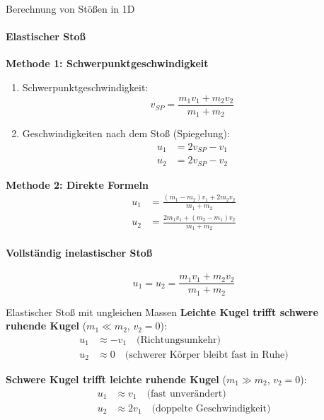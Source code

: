 \begin{KR}{Berechnung von Stößen in 1D}
    \paragraph{Elastischer Stoß}
    \textbf{Methode 1: Schwerpunktgeschwindigkeit}
    \begin{enumerate}
        \item Schwerpunktgeschwindigkeit:
        \begin{equation}
            v_{SP} = \frac{m_1 v_1 + m_2 v_2}{m_1 + m_2}
        \end{equation}
        
        \item Geschwindigkeiten nach dem Stoß (Spiegelung):
        \begin{align}
            u_1 &= 2v_{SP} - v_1 \\
            u_2 &= 2v_{SP} - v_2
        \end{align}
    \end{enumerate}
    
    \textbf{Methode 2: Direkte Formeln}
    \begin{align}
        u_1 &= \frac{(m_1 - m_2)v_1 + 2m_2 v_2}{m_1 + m_2} \\
        u_2 &= \frac{2m_1 v_1 + (m_2 - m_1)v_2}{m_1 + m_2}
    \end{align}
    
    \paragraph{Vollständig inelastischer Stoß}
    \begin{equation}
        u_1 = u_2 = \frac{m_1 v_1 + m_2 v_2}{m_1 + m_2}
    \end{equation}
\end{KR}

\begin{example2}{Elastischer Stoß mit ungleichen Massen}
    \textbf{Leichte Kugel trifft schwere ruhende Kugel} ($m_1 \ll m_2$, $v_2 = 0$):
    \begin{align}
        u_1 &\approx -v_1 \quad \text{(Richtungsumkehr)} \\
        u_2 &\approx 0 \quad \text{(schwerer Körper bleibt fast in Ruhe)}
    \end{align}
    
    \textbf{Schwere Kugel trifft leichte ruhende Kugel} ($m_1 \gg m_2$, $v_2 = 0$):
    \begin{align}
        u_1 &\approx v_1 \quad \text{(fast unverändert)} \\
        u_2 &\approx 2v_1 \quad \text{(doppelte Geschwindigkeit)}
    \end{align}
\end{example2}

